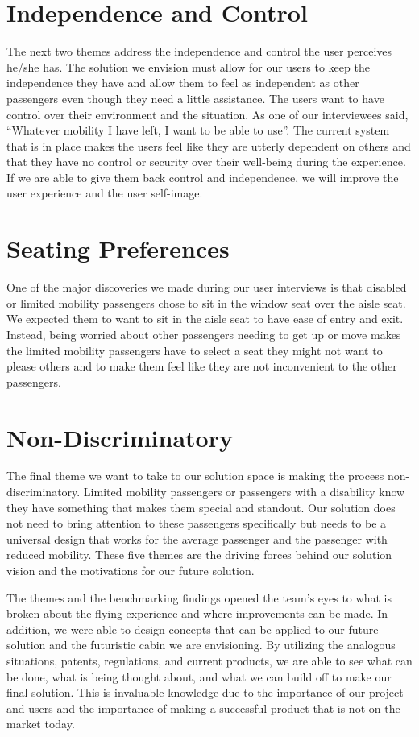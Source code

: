 \documentclass[a4paper, 12pt,conference]{new_cit_thesis}
\begin{document}
\section*{Independence and Control}
The next two themes address the independence and control the user perceives he/she has.  The solution we envision must allow for our users to keep the independence they have and allow them to feel as independent as other passengers even though they need a little assistance.  The users want to have control over their environment and the situation. As one of our interviewees said, “Whatever mobility I have left, I want to be able to use”. The current system that is in place makes the users feel like they are utterly dependent on others and that they have no control or security over their well-being during the experience.  If we are able to give them back control and independence, we will improve the user experience and the user self-image. 

\section*{Seating Preferences}
One of the major discoveries we made during our user interviews is that disabled or limited mobility passengers chose to sit in the window seat over the aisle seat.  We expected them to want to sit in the aisle seat to have ease of entry and exit.  Instead, being worried about other passengers needing to get up or move makes the limited mobility passengers have to select a seat they might not want to please others and to make them feel like they are not inconvenient to the other passengers.  

\section*{Non-Discriminatory}
The final theme we want to take to our solution space is making the process non-discriminatory.  Limited mobility passengers or passengers with a disability know they have something that makes them special and standout.  Our solution does not need to bring attention to these passengers specifically but needs to be a universal design that works for the average passenger and the passenger with reduced mobility.  These five themes are the driving forces behind our solution vision and the motivations for our future solution.

The themes and the benchmarking findings opened the team’s eyes to what is broken about the flying experience and where improvements can be made.  In addition, we were able to design concepts that can be applied to our future solution and the futuristic cabin we are envisioning. By utilizing the analogous situations, patents, regulations, and current products, we are able to see what can be done, what is being thought about, and what we can build off to make our final solution.  This is invaluable knowledge due to the importance of our project and users and the importance of making a successful product that is not on the market today.  
\end{document}
